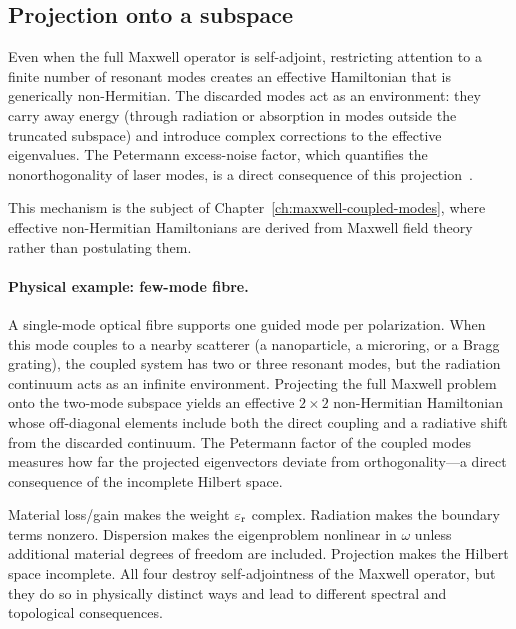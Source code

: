 \subsection{Projection onto a subspace}
\label{ssec:road-projection}

Even when the full Maxwell operator is self-adjoint, restricting attention
to a finite number of resonant modes creates an effective Hamiltonian that
is generically non-Hermitian. The discarded modes act as an environment:
they carry away energy (through radiation or absorption in modes outside
the truncated subspace) and introduce complex corrections to the effective
eigenvalues. The Petermann excess-noise factor, which quantifies the
nonorthogonality of laser modes, is a direct consequence of this
projection~\cite{kristensen2011effective}.

This mechanism is the subject of Chapter~\ref{ch:maxwell-coupled-modes},
where effective non-Hermitian Hamiltonians are derived from Maxwell
field theory rather than postulating them.

\paragraph{Physical example: few-mode fibre.}
A single-mode optical fibre supports one guided mode per polarization.
When this mode couples to a nearby scatterer (a nanoparticle, a
microring, or a Bragg grating), the coupled system has two or three
resonant modes, but the radiation continuum acts as an infinite
environment. Projecting the full Maxwell problem onto the two-mode
subspace yields an effective $2\times 2$ non-Hermitian Hamiltonian
whose off-diagonal elements include both the direct coupling and a
radiative shift from the discarded continuum. The Petermann factor of
the coupled modes measures how far the projected eigenvectors deviate
from orthogonality---a direct consequence of the incomplete Hilbert
space.

\begin{takeaway}
Material loss/gain makes the weight $\varepsilon_{\mathrm{r}}$ complex.
Radiation makes the boundary terms nonzero.
Dispersion makes the eigenproblem nonlinear in $\omega$ unless additional
material degrees of freedom are included.
Projection makes the Hilbert space incomplete.
All four destroy self-adjointness of the Maxwell operator, but they do so
in physically distinct ways and lead to different spectral and topological
consequences.
\end{takeaway}



